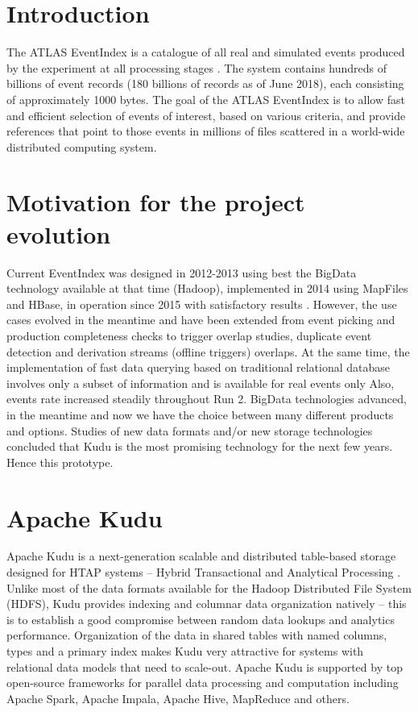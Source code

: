 \documentclass{webofc}
\begin{document}
\begin{linenumbers}
\section{Introduction}
\label{intro}
The ATLAS EventIndex is a catalogue of all real and simulated events produced by the experiment at all processing stages \cite{RefEI}. 
The system contains hundreds of billions of event records (180 billions of records as of June 2018), each consisting of approximately 1000 bytes. 
The goal of the ATLAS EventIndex is to allow fast and efficient selection of events of interest, based on various criteria, and provide references that point to those events in millions of files scattered in a world-wide distributed computing system.

\section{Motivation for the project evolution}
\label{sec-2}
Current EventIndex was designed in 2012-2013 using best the BigData technology available at that time (Hadoop), implemented in 2014 using MapFiles and HBase, in operation since 2015 with satisfactory results \cite{RefEI2}.
However, the use cases evolved in the meantime and have been extended from event picking and production completeness checks to trigger overlap studies, duplicate event detection and derivation streams (offline triggers) overlaps.
At the same time, the implementation of fast data querying based on traditional relational database involves only a subset of information and is available for real events only \cite{RefORA}
Also, events rate increased steadily throughout Run 2. \newline
BigData technologies advanced, in the meantime and now we have the choice between many different products and options.  
Studies of new data formats and/or new storage technologies \cite{RefZB} concluded that Kudu is the most promising technology for the next few years. Hence this prototype.

\section{Apache Kudu}
\label{sec-3}
Apache Kudu is a next-generation scalable and distributed table-based storage designed for HTAP systems – Hybrid Transactional and Analytical Processing \cite{RefKudu}.
Unlike most of the data formats available for the Hadoop Distributed File System (HDFS)\cite{HADOOP}, Kudu provides indexing and columnar data organization natively – this is to establish a good compromise between random data lookups and analytics performance.
Organization of the data in shared tables with named columns, types and a primary index makes Kudu very attractive for systems with relational data models that need to scale-out.
Apache Kudu is supported by top open-source frameworks for parallel data processing and computation including Apache Spark, Apache Impala, Apache Hive, MapReduce and others.


\end{linenumbers}
\end{document}
